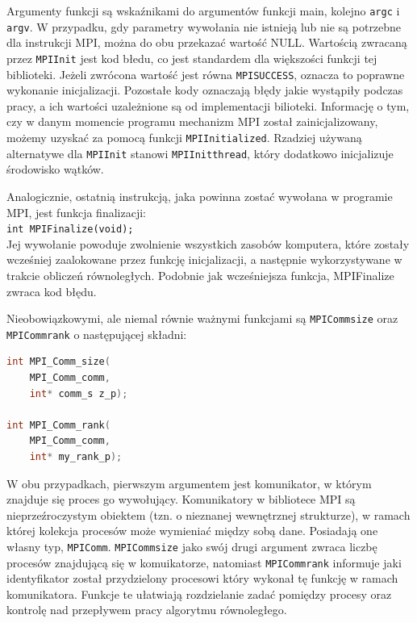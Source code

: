 Argumenty funkcji są wskaźnikami do argumentów funkcji main, kolejno \texttt{argc} i \texttt{argv}. W przypadku, gdy parametry wywołania nie istnieją lub nie są potrzebne dla instrukcji MPI, można do obu przekazać wartość NULL. Wartością zwracaną przez \texttt{MPI\textunderscore Init} jest kod błedu, co jest standardem dla większości funkcji tej biblioteki. Jeżeli zwrócona wartość jest równa \texttt{MPI\textunderscore SUCCESS}, oznacza to poprawne wykonanie inicjalizacji. Pozostałe kody oznaczają błędy jakie wystąpiły podczas pracy, a ich wartości uzależnione są od implementacji bilioteki. Informację o tym, czy w danym momencie programu mechanizm MPI został zainicjalizowany, możemy uzyskać za pomocą funkcji \texttt{MPI\textunderscore Initialized}. Rzadziej używaną alternatywe dla \texttt{MPI\textunderscore Init} stanowi \texttt{MPI\textunderscore Init\textunderscore thread}, który dodatkowo inicjalizuje środowisko wątków.

Analogicznie, ostatnią instrukcją, jaka powinna zostać wywołana w programie MPI, jest funkcja finalizacji: \\

\texttt{int MPI\textunderscore Finalize(void);} \\

Jej wywołanie powoduje zwolnienie wszystkich zasobów komputera, które zostały wcześniej zaalokowane przez funkcję inicjalizacji, a następnie wykorzystywane w trakcie obliczeń równoległych. Podobnie jak wcześniejsza funkcja, MPI\textunderscore Finalize zwraca kod błędu.

Nieobowiązkowymi, ale niemal równie ważnymi funkcjami są \texttt{MPI\textunderscore Comm\textunderscore size} oraz \texttt{MPI\textunderscore Comm\textunderscore rank} o następującej składni:

\begin{lstlisting}[language=C]
int MPI_Comm_size(
	MPI_Comm_comm,
	int* comm_s z_p);

int MPI_Comm_rank(
	MPI_Comm_comm,
	int* my_rank_p);
\end{lstlisting}
 
 W obu przypadkach, pierwszym argumentem jest komunikator, w którym znajduje się proces go wywołujący. Komunikatory w bibliotece MPI są nieprzeźroczystym obiektem (tzn. o nieznanej wewnętrznej strukturze), w ramach której kolekcja procesów może wymieniać między sobą dane. Posiadają one własny typ, \texttt{MPI\textunderscore Comm}. \texttt{MPI\textunderscore Comm\textunderscore size} jako swój drugi argument zwraca liczbę procesów znajdującą się w komuikatorze, natomiast \texttt{MPI\textunderscore Comm\textunderscore rank} informuje jaki identyfikator został przydzielony procesowi który wykonał tę funkcję w ramach komunikatora. Funkcje te ułatwiają rozdzielanie zadać pomiędzy procesy oraz kontrolę nad przepływem pracy algorytmu równoległego.
 
